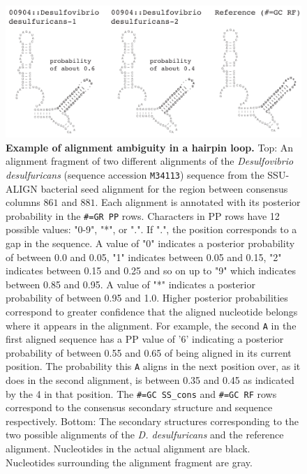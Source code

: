 \begin{figure}
\begin{center}
\vspace{0.2in}
\includegraphics[width=5.7in]{Figures/ambiguity}
\caption[Example of alignment ambiguity in a hairpin loop.]{
  \textbf{Example of alignment ambiguity in a hairpin loop.}  Top: An
  alignment fragment of two different alignments of the
  \emph{Desulfovibrio desulfuricans} (sequence accession
  \texttt{M34113}) sequence from the SSU-ALIGN bacterial seed
  alignment for the region between consensus columns $861$ and $881$.
  Each alignment is annotated with its posterior probability in the
  \texttt{\#=GR PP} rows.  Characters in PP rows have 12 possible
  values: "0-9", "*", or ".". If ".", the position corresponds to a
  gap in the sequence. A value of "0" indicates a posterior
  probability of between 0.0 and 0.05, "1" indicates between 0.05 and
  0.15, "2" indicates between 0.15 and 0.25 and so on up to "9" which
  indicates between 0.85 and 0.95. A value of "*" indicates a
  posterior probability of between 0.95 and 1.0. Higher posterior
  probabilities correspond to greater confidence that the aligned
  nucleotide belongs where it appears in the alignment.  For example,
  the second \texttt{A} in the first aligned sequence has a PP value
  of '6' indicating a posterior probability of between 0.55 and 0.65
  of being aligned in its current position. The
  probability this \texttt{A} aligns in the next position over, as it
  does in the second alignment, is between 0.35 and 0.45 as indicated
  by the 4 in that position.  The \texttt{\#=GC
  SS\_cons} and \texttt{\#=GC RF} rows correspond to the consensus
  secondary structure and sequence respectively.  
  Bottom: The
  secondary structures corresponding to the two possible alignments of
  the \emph{D. desulfuricans} and the reference alignment.  Nucleotides
  in the actual alignment are black. Nucleotides surrounding the
  alignment fragment are gray.}
\label{fig:ambiguity}
\end{center}
\end{figure}

